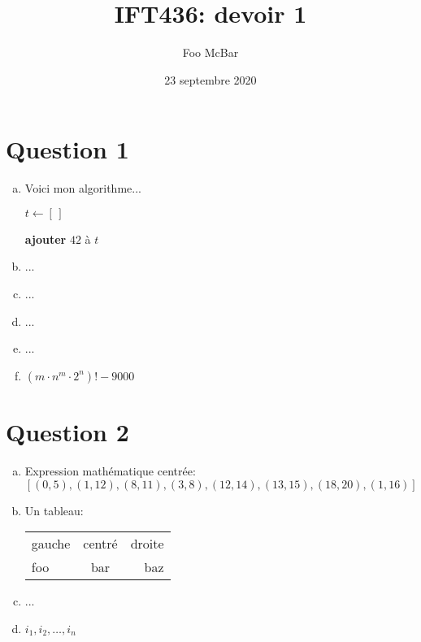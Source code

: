 \documentclass{article}
\title{IFT436: devoir 1}
\author{Foo McBar}
\date{23 septembre 2020}
\begin{document}
\maketitle

\section*{Question 1}

\begin{enumerate}[(a)]

\item Voici mon algorithme...

    \begin{algorithm}[H]
      \DontPrintSemicolon


      $t \leftarrow [\,]$\;


      \textbf{ajouter} $42$ à $t$\;
    \end{algorithm}

\item ...

\item ...

\item ...

\item ...

\item $(m \cdot n^m \cdot 2^n)! - 9000$

\end{enumerate}

\section*{Question 2}

\begin{enumerate}[(a)]

\item Expression mathématique centrée: \[ [(0, 5), (1, 12), (8, 11),
  (3, 8), (12, 14), (13, 15), (18, 20), (1, 16)] \]

\item Un tableau:

  \begin{center}
    \begin{tabular}{lcr}
      gauche & centré & droite \\

      foo & bar & baz
    \end{tabular}
  \end{center}

\item ...

\item $i_1, i_2, \ldots, i_n$

\end{enumerate}
\end{document}
